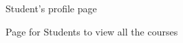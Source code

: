 \begin{figure}[H]
    \centering
    \caption{Student's profile page}
    \label{fig:stu_profile}
\end{figure}

\begin{figure}[H]
    \centering
    \caption{Page for Students to view all the courses}
    \label{fig:stu_allcourses}
\end{figure}

